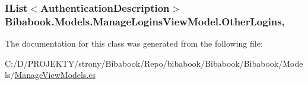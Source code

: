 \subsubsection[{Other\+Logins}]{\setlength{\rightskip}{0pt plus 5cm}I\+List$<$Authentication\+Description$>$ Bibabook.\+Models.\+Manage\+Logins\+View\+Model.\+Other\+Logins\hspace{0.3cm}{\ttfamily [get]}, {\ttfamily [set]}}\label{class_bibabook_1_1_models_1_1_manage_logins_view_model_a8ba2724ac7030943133521039f0d5e3f}


The documentation for this class was generated from the following file\+:\begin{DoxyCompactItemize}
\item 
C\+:/\+D/\+P\+R\+O\+J\+E\+K\+T\+Y/strony/\+Bibabook/\+Repo/bibabook/\+Bibabook/\+Bibabook/\+Models/\hyperlink{_manage_view_models_8cs}{Manage\+View\+Models.\+cs}\end{DoxyCompactItemize}
